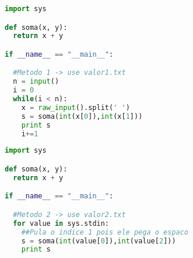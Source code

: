 \begin{frame}[fragile]
 \begin{lstlisting}[language=Python]
import sys

def soma(x, y):
  return x + y

if __name__ == "__main__":

  #Metodo 1 -> use valor1.txt
  n = input()
  i = 0
  while(i < n):
    x = raw_input().split(' ')
    s = soma(int(x[0]),int(x[1]))
    print s
    i+=1
 \end{lstlisting}
\end{frame}

\begin{frame}[fragile]
 \begin{lstlisting}[language=Python]
import sys

def soma(x, y):
  return x + y

if __name__ == "__main__":

  #Metodo 2 -> use valor2.txt
  for value in sys.stdin:
    ##Pula o indice 1 pois ele pega o espaco
    s = soma(int(value[0]),int(value[2]))
    print s
 \end{lstlisting}
\end{frame}